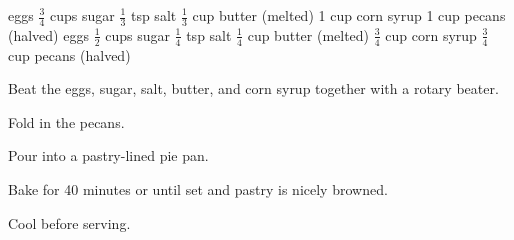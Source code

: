 \dishtype{\dessert}
\dishother{\vegetarian}
\begin{ingreds}
     eggs
        $\frac{3}{4}$ cups sugar
        $\frac{1}{3}$ tsp salt
        $\frac{1}{3}$ cup butter (melted)
        1 cup corn syrup
        1 cup pecans (halved)
     eggs
        $\frac{1}{2}$ cups sugar
        $\frac{1}{4}$ tsp salt
        $\frac{1}{4}$ cup butter (melted)
        $\frac{3}{4}$ cup corn syrup
        $\frac{3}{4}$ cup pecans (halved)
\end{ingreds}
\begin{method}
    Beat the eggs, sugar, salt, butter, and corn syrup together with a rotary beater.\par
    Fold in the pecans.\par
    Pour into a pastry-lined pie pan.\par
    Bake for 40 minutes or until set and pastry is nicely browned.\par
    Cool before serving.     
\end{method}